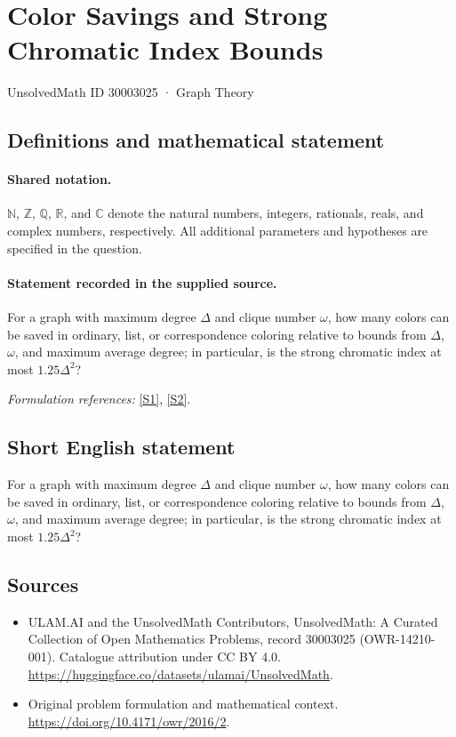 \documentclass[11pt]{article}
\newcommand{\sref}[2]{\hyperlink{source:#1:#2}{[S#2]}}
\begin{document}
\setcounter{section}{30003024}
\section{Color Savings and Strong Chromatic Index Bounds}\label{30003025}
{\small UnsolvedMath ID 30003025 · Graph Theory}
\subsection{Definitions and mathematical statement}

\paragraph{Shared notation.}$\mathbb N$, $\mathbb Z$, $\mathbb Q$, $\mathbb R$, and $\mathbb C$ denote the natural numbers, integers, rationals, reals, and complex numbers, respectively. All additional parameters and hypotheses are specified in the question.


\paragraph{Statement recorded in the supplied source.}
For a graph with maximum degree $\Delta$ and clique number $\omega$, how many colors can be saved in ordinary, list, or correspondence coloring relative to bounds from $\Delta$, $\omega$, and maximum average degree; in particular, is the strong chromatic index at most $1.25\Delta^2$?
\par\smallskip\textit{Formulation references:} \sref{30003025}{1}, \sref{30003025}{2}.
\subsection{Short English statement}
For a graph with maximum degree $\Delta$ and clique number $\omega$, how many colors can be saved in ordinary, list, or correspondence coloring relative to bounds from $\Delta$, $\omega$, and maximum average degree; in particular, is the strong chromatic index at most $1.25\Delta^2$?
\subsection{Sources}
\begin{itemize}
\item[\hypertarget{source:30003025:1}{S1}] ULAM.AI and the UnsolvedMath Contributors, UnsolvedMath: A Curated Collection of Open Mathematics Problems, record 30003025 (OWR-14210-001). Catalogue attribution under CC BY 4.0.
\url{https://huggingface.co/datasets/ulamai/UnsolvedMath}.
\item[\hypertarget{source:30003025:2}{S2}] Original problem formulation and mathematical context.
\url{https://doi.org/10.4171/owr/2016/2}.
\end{itemize}
\label{end:30003025}
\end{document}
